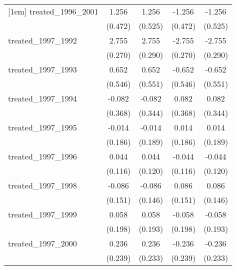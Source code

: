 {\begin{tabular}{l*{4}{c}}
[1em]
treated\_1996\_2001&       1.256\sym{**} &       1.256\sym{*}  &      -1.256\sym{**} &      -1.256\sym{*}  \\
            &     (0.472)         &     (0.525)         &     (0.472)         &     (0.525)         \\
[1em]
treated\_1997\_1992&       2.755\sym{***}&       2.755\sym{***}&      -2.755\sym{***}&      -2.755\sym{***}\\
            &     (0.270)         &     (0.290)         &     (0.270)         &     (0.290)         \\
[1em]
treated\_1997\_1993&       0.652         &       0.652         &      -0.652         &      -0.652         \\
            &     (0.546)         &     (0.551)         &     (0.546)         &     (0.551)         \\
[1em]
treated\_1997\_1994&      -0.082         &      -0.082         &       0.082         &       0.082         \\
            &     (0.368)         &     (0.344)         &     (0.368)         &     (0.344)         \\
[1em]
treated\_1997\_1995&      -0.014         &      -0.014         &       0.014         &       0.014         \\
            &     (0.186)         &     (0.189)         &     (0.186)         &     (0.189)         \\
[1em]
treated\_1997\_1996&       0.044         &       0.044         &      -0.044         &      -0.044         \\
            &     (0.116)         &     (0.120)         &     (0.116)         &     (0.120)         \\
[1em]
treated\_1997\_1998&      -0.086         &      -0.086         &       0.086         &       0.086         \\
            &     (0.151)         &     (0.146)         &     (0.151)         &     (0.146)         \\
[1em]
treated\_1997\_1999&       0.058         &       0.058         &      -0.058         &      -0.058         \\
            &     (0.198)         &     (0.193)         &     (0.198)         &     (0.193)         \\
[1em]
treated\_1997\_2000&       0.236         &       0.236         &      -0.236         &      -0.236         \\
            &     (0.239)         &     (0.233)         &     (0.239)         &     (0.233)         \\

\end{tabular}}

